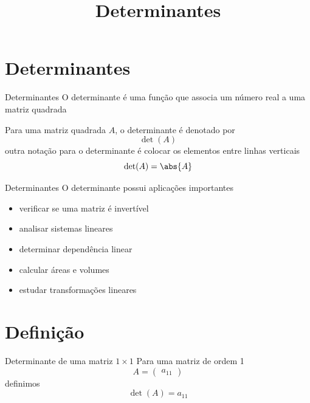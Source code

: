 \documentclass[fleqn,aspectratio=169,12pt]{beamer}
\title{Determinantes}
\begin{document}
\addtitle

\section{Determinantes}

\begin{frame}{Determinantes}
  O determinante é uma função que associa um número real a uma matriz quadrada

  \pause
  \medskip

  Para uma matriz quadrada $A$, o determinante é denotado por
  \[
    \det(A)
  \]
  \pause
  outra notação para o determinante é colocar os elementos entre linhas verticais
  \[
    \det(A) = \abs{A}
  \]
\end{frame}

\begin{frame}{Determinantes}
  O determinante possui aplicações importantes
  \begin{itemize}[<+->]
    \item verificar se uma matriz é invertível
    \item analisar sistemas lineares
    \item determinar dependência linear
    \item calcular áreas e volumes
    \item estudar transformações lineares
  \end{itemize}
\end{frame}

\section{Definição}

\begin{frame}{Determinante de uma matriz $1\times 1$}
  Para uma matriz de ordem 1
  \[
    A =
    \begin{pmatrix}
      a_{11}
    \end{pmatrix}
  \]
  \pause
  definimos
  \[
    \det(A) = a_{11}
  \]
\end{frame}
\end{document}
